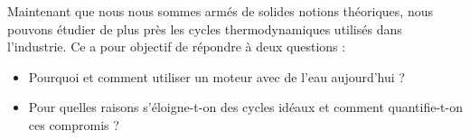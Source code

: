 Maintenant que nous nous sommes armés de solides notions théoriques, nous pouvons étudier de plus près les cycles thermodynamiques utilisés dans l’industrie. Ce \coursneuf a pour objectif de répondre à deux questions :
\begin{itemize}
	\item Pourquoi et comment utiliser un moteur avec de l’eau aujourd’hui ?
	\item Pour quelles raisons s’éloigne-t-on des cycles idéaux et comment quantifie-t-on ces compromis ?
\end{itemize}
